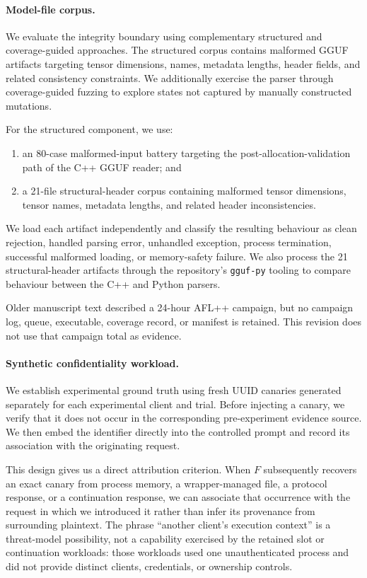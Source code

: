 \paragraph{Model-file corpus.}
We evaluate the integrity boundary using complementary structured and
coverage-guided approaches. The structured corpus contains malformed GGUF
artifacts targeting tensor dimensions, names, metadata lengths, header
fields, and related consistency constraints. We additionally exercise
the parser through coverage-guided fuzzing to explore states not captured
by manually constructed mutations.

For the structured component, we use:

\begin{enumerate}
    \item an 80-case malformed-input battery targeting the
    post-allocation-validation path of the C++ GGUF reader; and
    \item a 21-file structural-header corpus containing malformed tensor
    dimensions, tensor names, metadata lengths, and related header
    inconsistencies.
\end{enumerate}

We load each artifact independently and classify the resulting behaviour
as clean rejection, handled parsing error, unhandled exception, process
termination, successful malformed loading, or memory-safety failure. We
also process the 21 structural-header artifacts through the repository's
\texttt{gguf-py} tooling to compare behaviour between the C++ and Python
parsers.

Older manuscript text described a 24-hour AFL++ campaign, but no campaign
log, queue, executable, coverage record, or manifest is retained. This
revision does not use that campaign total as evidence.

\paragraph{Synthetic confidentiality workload.}
We establish experimental ground truth using fresh UUID canaries
generated separately for each experimental client and trial. Before injecting a
canary, we verify that it does not occur in the corresponding
pre-experiment evidence source. We then embed the identifier directly
into the controlled prompt and record its association with the
originating request.

This design gives us a direct attribution criterion. When $F$
subsequently recovers an exact canary from process memory, a
wrapper-managed file, a protocol response, or a continuation response, we
can associate that occurrence with the request in which we introduced it
rather than infer its provenance from surrounding plaintext. The phrase
``another client's execution context'' is a threat-model possibility, not a
capability exercised by the retained slot or continuation workloads: those
workloads used one unauthenticated process and did not provide distinct
clients, credentials, or ownership controls.

